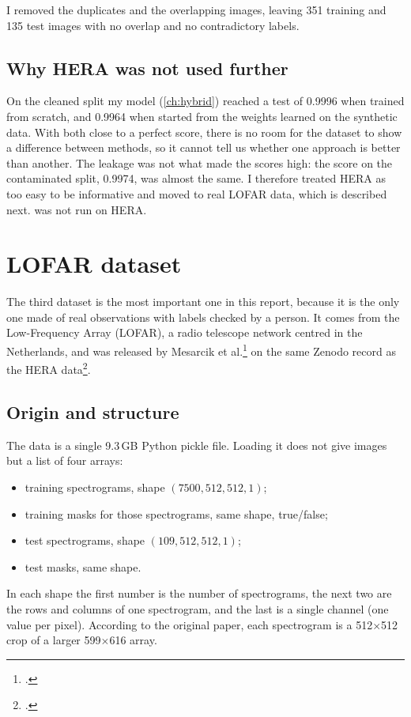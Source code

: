 I removed the duplicates and the overlapping images, leaving 351 training and
135 test images with no overlap and no contradictory labels.

\subsection{Why HERA was not used further}
On the cleaned split my model (\cref{ch:hybrid}) reached a test \Fone{} of
0.9996 when trained from scratch, and 0.9964 when started from the weights
learned on the synthetic data. With both close to a perfect score, there is no
room for the dataset to show a difference between methods, so it cannot tell
us whether one approach is better than another. The leakage was not what made
the scores high: the score on the contaminated split, 0.9974, was almost the
same. I therefore treated HERA as too easy to be informative and moved to real
LOFAR data, which is described next. \tfunet{} was not run on HERA.

\section{LOFAR dataset}
\label{sec:lofar}
The third dataset is the most important one in this report, because it is the
only one made of real observations with labels checked by a person. It comes
from the Low-Frequency Array (LOFAR), a radio telescope network centred in the
Netherlands, and was released by Mesarcik et al.\footcite{mesarcik2022} on the same
Zenodo record as the HERA data\footcite{mesarcik2022data}.

\subsection{Origin and structure}
The data is a single 9.3\,GB Python pickle file. Loading it does not give
images but a list of four arrays:
\begin{itemize}
  \item training spectrograms, shape $(7500, 512, 512, 1)$;
  \item training masks for those spectrograms, same shape, true/false;
  \item test spectrograms, shape $(109, 512, 512, 1)$;
  \item test masks, same shape.
\end{itemize}
In each shape the first number is the number of spectrograms, the next two
are the rows and columns of one spectrogram, and the last is a single channel
(one value per pixel). According to the original paper, each spectrogram is a
512$\times$512 crop of a larger 599$\times$616 array.

